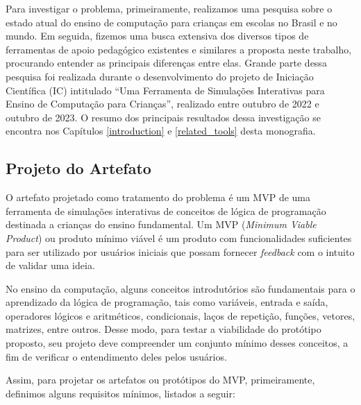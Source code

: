 Para investigar o problema, primeiramente, realizamos uma pesquisa sobre o estado atual do ensino de computação para crianças em escolas no Brasil e no mundo. Em seguida, fizemos uma busca extensiva dos diversos tipos de ferramentas de apoio pedagógico existentes e similares a proposta neste trabalho, procurando entender as principais diferenças entre elas. Grande parte dessa pesquisa foi realizada durante o desenvolvimento do projeto de Iniciação Científica (IC) intitulado \enquote{Uma Ferramenta de Simulações Interativas para Ensino de Computação para Crianças}, realizado entre outubro de 2022 e outubro de 2023. O resumo dos principais resultados dessa investigação se encontra nos Capítulos \ref{introduction} e \ref{related_tools} desta monografia.


\subsection{Projeto do Artefato} \label{design}

O artefato projetado como tratamento do problema é um MVP de uma ferramenta de simulações interativas de conceitos de lógica de programação destinada a crianças do ensino fundamental. Um MVP (\textit{Minimum Viable Product}) ou produto mínimo viável é um produto com funcionalidades suficientes para ser utilizado por usuários iniciais que possam fornecer \textit{feedback} com o intuito de validar uma ideia. 

No ensino da computação, alguns conceitos introdutórios são fundamentais para o aprendizado da lógica de programação, tais como variáveis, entrada e saída, operadores lógicos e aritméticos, condicionais, laços de repetição, funções, vetores, matrizes, entre outros. Desse modo, para testar a viabilidade do protótipo proposto, seu projeto deve compreender um conjunto mínimo desses conceitos, a fim de verificar o entendimento deles pelos usuários. 

Assim, para projetar os artefatos ou protótipos do MVP, primeiramente, definimos alguns requisitos mínimos, listados a seguir:

